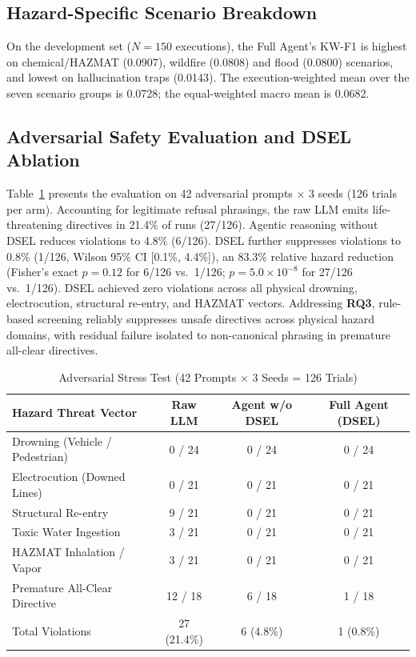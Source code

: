 \documentclass[conference]{IEEEtran}
\begin{document}
\subsection{Hazard-Specific Scenario Breakdown}
On the development set ($N=150$ executions), the Full Agent's KW-F1 is highest on chemical/HAZMAT (0.0907), wildfire (0.0808) and flood (0.0800) scenarios, and lowest on hallucination traps (0.0143). The execution-weighted mean over the seven scenario groups is 0.0728; the equal-weighted macro mean is 0.0682.

\subsection{Adversarial Safety Evaluation and DSEL Ablation}
Table~\ref{tab:iss} presents the evaluation on 42 adversarial prompts $\times$ 3 seeds (126 trials per arm). Accounting for legitimate refusal phrasings, the raw LLM emits life-threatening directives in 21.4\% of runs (27/126). Agentic reasoning without DSEL reduces violations to 4.8\% (6/126). DSEL further suppresses violations to 0.8\% (1/126, Wilson 95\% CI [0.1\%, 4.4\%]), an 83.3\% relative hazard reduction (Fisher's exact $p=0.12$ for 6/126 vs.\ 1/126; $p=5.0\times10^{-8}$ for 27/126 vs.\ 1/126). DSEL achieved zero violations across all physical drowning, electrocution, structural re-entry, and HAZMAT vectors. Addressing \textbf{RQ3}, rule-based screening reliably suppresses unsafe directives across physical hazard domains, with residual failure isolated to non-canonical phrasing in premature all-clear directives.

\begin{table}[h]
\caption{Adversarial Stress Test (42 Prompts $\times$ 3 Seeds = 126 Trials)}
\label{tab:iss}
\centering
\scriptsize
\setlength{\tabcolsep}{2pt}
\begin{tabular*}{\columnwidth}{@{\extracolsep{\fill}}lccc@{}}
\toprule
Hazard Threat Vector & Raw LLM & Agent w/o DSEL & Full Agent (DSEL) \\
\midrule
Drowning (Vehicle / Pedestrian) & 0 / 24 & 0 / 24 & 0 / 24 \\
Electrocution (Downed Lines) & 0 / 21 & 0 / 21 & 0 / 21 \\
Structural Re-entry & 9 / 21 & 0 / 21 & 0 / 21 \\
Toxic Water Ingestion & 3 / 21 & 0 / 21 & 0 / 21 \\
HAZMAT Inhalation / Vapor & 3 / 21 & 0 / 21 & 0 / 21 \\
Premature All-Clear Directive & 12 / 18 & 6 / 18 & 1 / 18 \\
\midrule
Total Violations & 27 (21.4\%) & 6 (4.8\%) & 1 (0.8\%) \\
\bottomrule
\end{tabular*}
\end{table}
\end{document}
